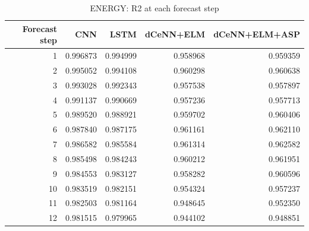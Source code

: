 \begin{table}
\caption{ENERGY: R2 at each forecast step}
\begin{tabular}{rrrrr}
\toprule
Forecast step & CNN & LSTM & dCeNN+ELM & dCeNN+ELM+ASP \\
\midrule
1 & 0.996873 & 0.994999 & 0.958968 & 0.959359 \\
2 & 0.995052 & 0.994108 & 0.960298 & 0.960638 \\
3 & 0.993028 & 0.992343 & 0.957538 & 0.957897 \\
4 & 0.991137 & 0.990669 & 0.957236 & 0.957713 \\
5 & 0.989520 & 0.988921 & 0.959702 & 0.960406 \\
6 & 0.987840 & 0.987175 & 0.961161 & 0.962110 \\
7 & 0.986582 & 0.985584 & 0.961314 & 0.962582 \\
8 & 0.985498 & 0.984243 & 0.960212 & 0.961951 \\
9 & 0.984553 & 0.983127 & 0.958282 & 0.960596 \\
10 & 0.983519 & 0.982151 & 0.954324 & 0.957237 \\
11 & 0.982503 & 0.981164 & 0.948645 & 0.952350 \\
12 & 0.981515 & 0.979965 & 0.944102 & 0.948851 \\
\bottomrule
\end{tabular}
\end{table}
